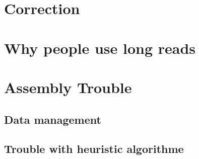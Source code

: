 \documentclass[main.tex]{subfiles}
\begin{document}



\section{Correction}

\section{Why people use long reads}

\section{Assembly Trouble}

\subsection{Data management}

\subsection{Trouble with heuristic algorithme}

\end{document}
